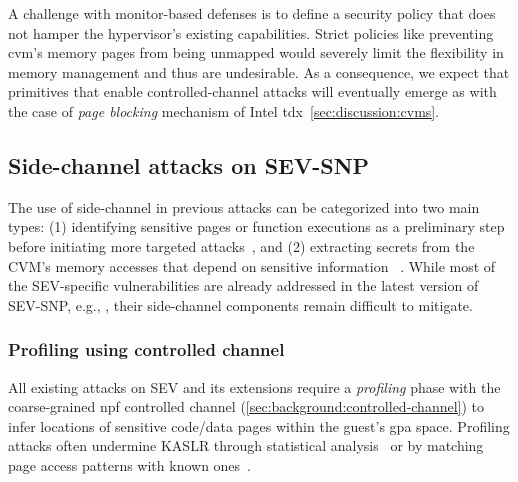 	A challenge with monitor-based defenses is to define a security policy that does not hamper the hypervisor's existing capabilities.
	Strict policies like preventing \gls{cvm}'s memory pages from being unmapped would severely limit the flexibility in memory management and thus are undesirable.
	As a consequence, we expect that primitives that enable controlled-channel attacks will eventually emerge as with the case of \emph{page blocking} mechanism of Intel \gls{tdx}~\cref{sec:discussion:cvms}.
\fi

\subsection{Side-channel attacks on SEV-SNP}
\label{subsec:related-work:attacks}
The use of side-channel in previous attacks can be categorized into two main types: (1) identifying sensitive pages or function executions as a preliminary step before initiating more targeted attacks~\cite{li2021cipherleaks,li2022systematic,li2019exploiting,cachewarp,sevstep,werner2019severest,morbitzer2018severed,heckler,wesee}, and (2) extracting secrets from the CVM's memory accesses that depend on sensitive information ~\cite{li2021cipherleaks,li2022systematic,sevstep,ciphersteal}.
While most of the SEV-specific vulnerabilities are already addressed in the latest version of SEV-SNP, e.g., \cite{li2021cipherleaks,cachewarp,li2019exploiting,werner2019severest,morbitzer2018severed}, their side-channel components remain difficult to mitigate.

\subsubsection{Profiling using controlled channel}
\label{sec:relatedwork:profiling}
All existing attacks on SEV and its extensions require a \emph{profiling} phase with the coarse-grained \gls{npf} controlled channel (\cref{sec:background:controlled-channel}) to infer locations of sensitive code/data pages within the guest's \gls{gpa} space.
Profiling attacks often undermine KASLR through statistical analysis~\cite{heckler,wesee,morbitzer2018severed,li2022systematic} or by matching page access patterns with known ones~\cite{li2019exploiting,wilke2020sevurity}.

